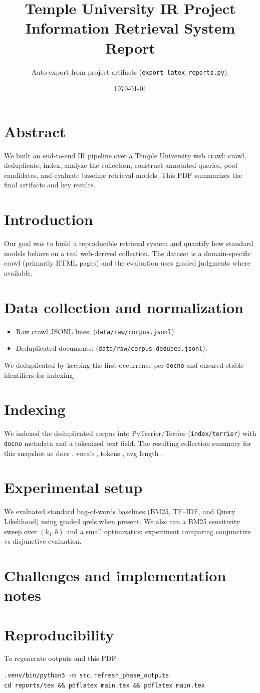 \documentclass[11pt,a4paper]{article}
\title{Temple University IR Project\\Information Retrieval System Report}
\author{Auto-export from project artifacts (\texttt{export\_latex\_reports.py}).}
\date{\today}
\begin{document}
\sloppy
\maketitle
\tableofcontents
\bigskip
\section{Abstract}
We built an end-to-end IR pipeline over a Temple University web crawl: crawl, deduplicate, index, analyze the collection, construct annotated queries, pool candidates, and evaluate baseline retrieval models. This PDF summarizes the final artifacts and key results.

\section{Introduction}
Our goal was to build a reproducible retrieval system and quantify how standard models behave on a real web-derived collection. The dataset is a domain-specific crawl (primarily HTML pages) and the evaluation uses graded judgments where available.

\section{Data collection and normalization}
\begin{itemize}
  \item Raw crawl JSONL lines: \textbf{\RawCorpusLines} (\texttt{data/raw/corpus.jsonl}).
  \item Deduplicated documents: \textbf{\DedupDocs} (\texttt{data/raw/corpus\_deduped.jsonl}).
\end{itemize}
We deduplicated by keeping the first occurrence per \texttt{docno} and ensured stable identifiers for indexing.

\section{Indexing}
We indexed the deduplicated corpus into PyTerrier/Terrier (\texttt{index/terrier}) with \texttt{docno} metadata and a tokenized text field. The resulting collection summary for this snapshot is: docs \textbf{\SummaryDocs}, vocab \textbf{\SummaryVocab}, tokens \textbf{\SummaryTokens}, avg length \textbf{\SummaryAvgLen}.

\section{Experimental setup}
We evaluated standard bag-of-words baselines (BM25, TF--IDF, and Query Likelihood) using graded qrels when present. We also ran a BM25 sensitivity sweep over $(k_1, b)$ and a small optimization experiment comparing conjunctive vs disjunctive evaluation.

\section{Challenges and implementation notes}




\section{Reproducibility}
To regenerate outputs and this PDF:
\begin{verbatim}
.venv/bin/python3 -m src.refresh_phase_outputs
cd reports/tex && pdflatex main.tex && pdflatex main.tex
\end{verbatim}
\end{document}
